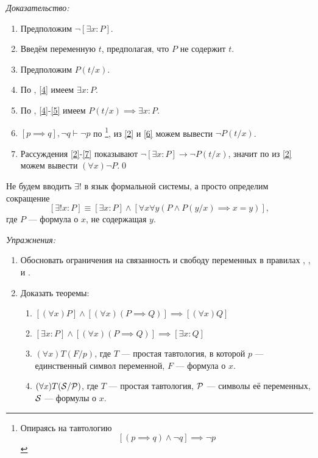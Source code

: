 {\it Доказательство:}
\begin{enumerate}[label=(\arabic*)]
	\item{}\label{2}Предположим $\lnot [\exists x:P]$.
	\item{}\label{3}Введём переменную $t$, предполагая, что $P$ не содержит $t$.
	\item{}\label{4}Предположим $P(t/x)$.
	\item{}\label{5}По \Eii{}, \ref{4} имеем $\exists x:P$.
	\item{}\label{6}По \implic{}, \ref{4}-\ref{5} имеем
	$P(t/x)\implies \exists x:P$.
	\item{}\label{7}${[p\implies q],\lnot q\vdash \lnot p}$ по \taut{}\footnote{
		Опираясь на тавтологию
		\[
			[(p\implies q)\land\lnot q]\implies\lnot p
		\]
	}, из
	\ref{2} и \ref{6} можем вывести $\lnot P(t/x)$.
	\item{}\label{8}Рассуждения \ref{2}-\ref{7} показывают
	$\lnot[\exists x:P]\to\lnot P(t/x)$, значит по \Aii{} из \ref{2} можем
	вывести $(\forall x)\lnot P$.\qed
\end{enumerate}

Не будем вводить $\exists!$ в язык формальной системы, а просто определим сокращение
\[
	[\exists! x:P]\equiv[\exists x:P]\land[\forall x\forall y(P\land P(y/x)\implies x=y)],
\]
где $P$ --- формула о $x$, не содержащая $y$.

\vspace{1em}
{\it Упражнения:}
\begin{enumerate}
	\item{}Обосновать ограничения на связанность и свободу переменных в правилах
	\Aii{}, \Aee{}, \Eii{} и \Eee{}.
	\item{}\label{ex:obv_thm}Доказать теоремы:
	\begin{enumerate}
		\item{}$[(\forall x)P]\land[(\forall x)(P\implies Q)]
			\implies [(\forall x)Q]$\label{thm:obv_forall}
		\item{}$[\exists x:P]\land[(\forall x)(P\implies Q)]
			\implies [\exists x:Q]$
		\item{}$(\forall x)T(F/p)$, где $T$ --- простая тавтология,
		в которой $p$ --- единственный символ переменной, $F$ --- формула о $x$.
		\item{}$(\forall x)T(\mathcal S/\mathcal P)$, где $T$ --- простая тавтология,
		$\mathcal P$ --- символы её переменных, $\mathcal S$ --- формулы о $x$.\label{thm:obv_taut}
	\end{enumerate}
\end{enumerate}


